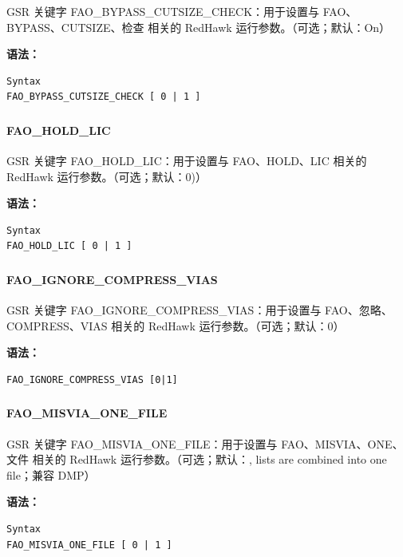 GSR 关键字 FAO_BYPASS_CUTSIZE_CHECK：用于设置与 FAO、BYPASS、CUTSIZE、检查 相关的 RedHawk 运行参数。（可选；默认：On）

\textbf{语法：}
\begin{lstlisting}
Syntax
FAO_BYPASS_CUTSIZE_CHECK [ 0 | 1 ]
\end{lstlisting}

\subsubsection{}
\paragraph*{FAO_HOLD_LIC}

GSR 关键字 FAO_HOLD_LIC：用于设置与 FAO、HOLD、LIC 相关的 RedHawk 运行参数。（可选；默认：0)）

\textbf{语法：}
\begin{lstlisting}
Syntax
FAO_HOLD_LIC [ 0 | 1 ]
\end{lstlisting}

\subsubsection{}
\paragraph*{FAO_IGNORE_COMPRESS_VIAS}

GSR 关键字 FAO_IGNORE_COMPRESS_VIAS：用于设置与 FAO、忽略、COMPRESS、VIAS 相关的 RedHawk 运行参数。（可选；默认：0）

\textbf{语法：}
\begin{lstlisting}
FAO_IGNORE_COMPRESS_VIAS [0|1]
\end{lstlisting}

\subsubsection{}
\paragraph*{FAO_MISVIA_ONE_FILE}

GSR 关键字 FAO_MISVIA_ONE_FILE：用于设置与 FAO、MISVIA、ONE、文件 相关的 RedHawk 运行参数。（可选；默认：, lists are combined into one file；兼容 DMP）

\textbf{语法：}
\begin{lstlisting}
Syntax
FAO_MISVIA_ONE_FILE [ 0 | 1 ]
\end{lstlisting}

